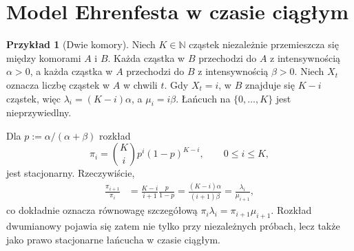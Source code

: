 \documentclass[11pt,a4paper,oneside]{report}
\numberwithin{equation}{chapter}
\theoremstyle{plain}
\theoremstyle{definition}
\newtheorem{przyklad}{Przykład}[chapter]
\theoremstyle{remark}
\newcommand{\N}{\mathbb{N}}
\begin{document}
\section{Model Ehrenfesta w czasie ciągłym}
\begin{przyklad}[Dwie komory]
Niech $K\in\N$ cząstek niezależnie przemieszcza się
między komorami $A$ i $B$. Każda cząstka w $B$ przechodzi
do $A$ z intensywnością $\alpha>0$, a każda cząstka w $A$
przechodzi do $B$ z intensywnością $\beta>0$.
Niech $X_t$ oznacza liczbę cząstek w $A$ w chwili $t$.
Gdy $X_t=i$, w $B$ znajduje się $K-i$ cząstek, więc
$\lambda_i=(K-i)\alpha$, a $\mu_i=i\beta$.
Łańcuch na $\{0,\ldots,K\}$ jest nieprzywiedlny.

Dla $p:=\alpha/(\alpha+\beta)$ rozkład
\[
\pi_i=\binom Ki p^i(1-p)^{K-i},\qquad 0\le i\le K,
\]
jest stacjonarny. Rzeczywiście,
\begin{align*}
\frac{\pi_{i+1}}{\pi_i}
&=\frac{K-i}{i+1}\frac{p}{1-p}
=\frac{(K-i)\alpha}{(i+1)\beta}
=\frac{\lambda_i}{\mu_{i+1}},
\end{align*}
co dokładnie oznacza równowagę szczegółową
$\pi_i\lambda_i=\pi_{i+1}\mu_{i+1}$.
Rozkład dwumianowy pojawia się zatem nie tylko
przy niezależnych próbach, lecz także jako prawo
stacjonarne łańcucha w czasie ciągłym.
\end{przyklad}
\end{document}
